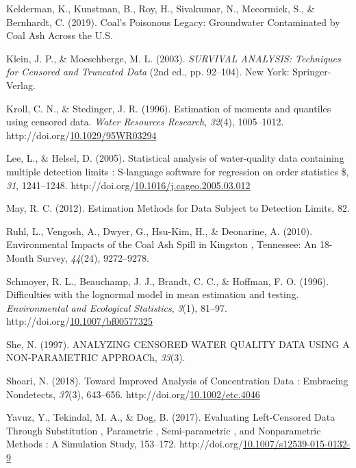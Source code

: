\documentclass[12pt, twoside]{amherstthesis}
\newenvironment{CSLReferences}%
  {}%
  {\par}
\begin{document}
\begin{CSLReferences}{1}{0}
\leavevmode\hypertarget{ref-Kelderman2019}{}%
Kelderman, K., Kunstman, B., Roy, H., Sivakumar, N., Mccormick, S., \& Bernhardt, C. (2019). {Coal's Poisonous Legacy: Groundwater Contaminated by Coal Ash Across the U.S.}

\leavevmode\hypertarget{ref-Klein2003}{}%
Klein, J. P., \& Moeschberge, M. L. (2003). \emph{{SURVIVAL ANALYSIS: Techniques for Censored and Truncated Data}} (2nd ed., pp. 92--104). New York: Springer-Verlag.

\leavevmode\hypertarget{ref-Kroll1996}{}%
Kroll, C. N., \& Stedinger, J. R. (1996). {Estimation of moments and quantiles using censored data}. \emph{Water Resources Research}, \emph{32}(4), 1005--1012. http://doi.org/\href{https://doi.org/10.1029/95WR03294}{10.1029/95WR03294}

\leavevmode\hypertarget{ref-Lee2005}{}%
Lee, L., \& Helsel, D. (2005). {Statistical analysis of water-quality data containing multiple detection limits : S-language software for regression on order statistics {\$}}, \emph{31}, 1241--1248. http://doi.org/\href{https://doi.org/10.1016/j.cageo.2005.03.012}{10.1016/j.cageo.2005.03.012}

\leavevmode\hypertarget{ref-May2012}{}%
May, R. C. (2012). {Estimation Methods for Data Subject to Detection Limits}, 82.

\leavevmode\hypertarget{ref-Ruhl2010}{}%
Ruhl, L., Vengosh, A., Dwyer, G., Hsu-Kim, H., \& Deonarine, A. (2010). {Environmental Impacts of the Coal Ash Spill in Kingston , Tennessee: An 18-Month Survey}, \emph{44}(24), 9272--9278.

\leavevmode\hypertarget{ref-Schmoyer1996}{}%
Schmoyer, R. L., Beauchamp, J. J., Brandt, C. C., \& Hoffman, F. O. (1996). {Difficulties with the lognormal model in mean estimation and testing}. \emph{Environmental and Ecological Statistics}, \emph{3}(1), 81--97. http://doi.org/\href{https://doi.org/10.1007/bf00577325}{10.1007/bf00577325}

\leavevmode\hypertarget{ref-She1997}{}%
She, N. (1997). {ANALYZING CENSORED WATER QUALITY DATA USING A NON-PARAMETRIC APPROACh}, \emph{33}(3).

\leavevmode\hypertarget{ref-Shoari2018}{}%
Shoari, N. (2018). {Toward Improved Analysis of Concentration Data : Embracing Nondetects}, \emph{37}(3), 643--656. http://doi.org/\href{https://doi.org/10.1002/etc.4046}{10.1002/etc.4046}

\leavevmode\hypertarget{ref-Yavuz2017}{}%
Yavuz, Y., Tekindal, M. A., \& Dog, B. (2017). {Evaluating Left-Censored Data Through Substitution , Parametric , Semi-parametric , and Nonparametric Methods : A Simulation Study}, 153--172. http://doi.org/\href{https://doi.org/10.1007/s12539-015-0132-9}{10.1007/s12539-015-0132-9}

\end{CSLReferences}
\end{document}
